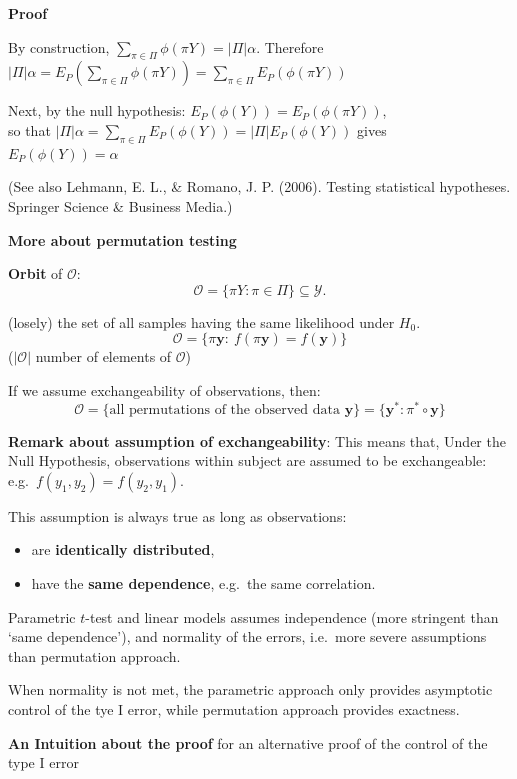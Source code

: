 \documentclass[
]{article}
\providecommand{\tightlist}{%
  \setlength{\itemsep}{0pt}\setlength{\parskip}{0pt}}
\begin{document}
\textbf{Proof}

By construction, \(\sum_{\pi\in \Pi} \phi(\pi Y)=|\Pi|\alpha\).
Therefore
\(|\Pi|\alpha= E_P(\sum_{\pi\in\Pi}\phi(\pi Y))= \sum_{\pi\in\Pi}E_P(\phi(\pi Y))\)

Next, by the null hypothesis: \(E_P(\phi(Y))=E_P(\phi(\pi Y))\),\\
so that \(|\Pi|\alpha= \sum_{\pi\in\Pi}E_P(\phi(Y))=|\Pi|E_P(\phi(Y))\)
gives\\
\(E_P(\phi(Y))=\alpha\)

(See also Lehmann, E. L., \& Romano, J. P. (2006). Testing statistical
hypotheses. Springer Science \& Business Media.)

\textbf{More about permutation testing}

\textbf{Orbit} of \(\mathcal{O}\):
\[\mathcal{O}=\{\pi Y : \pi \in \Pi\} \subseteq \mathcal{Y}.\]

(losely) the set of all samples having the same likelihood under
\(H_0\).\\
\[\mathcal{O}=\{\pi \mathbf{y}:\ f(\pi \mathbf{y})=f(\mathbf{y}) \}\]
(\(|\mathcal{O}|\) number of elements of \(\mathcal{O}\))

If we assume exchangeability of observations, then:
\[\mathcal{O}=\{\textrm{all permutations of the observed data }\mathbf{y}\} = \{\mathbf{y}^*:\pi^*\circ\mathbf{y}\}\]

\textbf{Remark about assumption of exchangeability}: This means that,
Under the Null Hypothesis, observations within subject are assumed to be
exchangeable: e.g.~\(f(y_1,y_2)=f(y_2,y_1)\).

This assumption is always true as long as observations:

\begin{itemize}
\tightlist
\item
  are \textbf{identically distributed},\\
\item
  have the \textbf{same dependence}, e.g.~the same correlation.
\end{itemize}

Parametric \(t\)-test and linear models assumes independence (more
stringent than `same dependence'), and normality of the errors,
i.e.~more severe assumptions than permutation approach.

When normality is not met, the parametric approach only provides
asymptotic control of the tye I error, while permutation approach
provides exactness.

\textbf{An Intuition about the proof} for an alternative proof of the
control of the type I error
\end{document}
